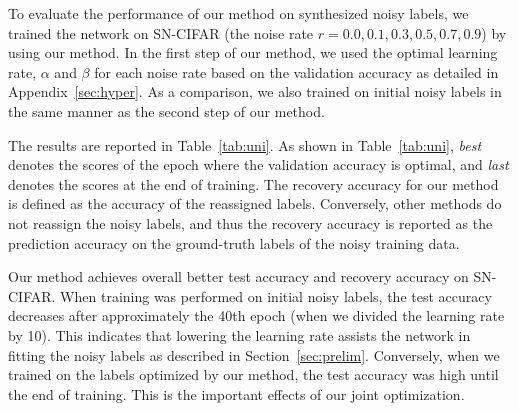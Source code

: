 \documentclass[10pt,twocolumn,letterpaper]{article}
\newcommand{\Tref}[1]{Table~\ref{#1}}
\newcommand{\Sref}[1]{Section~\ref{#1}}
\newcommand{\APref}[1]{Appendix~\ref{#1}}
\begin{document}
To evaluate the performance of our method on synthesized noisy labels, we trained the network on SN-CIFAR (the noise rate $r=0.0,0.1,0.3,0.5,0.7,0.9$) by using our method.
In the first step of our method, we used the optimal learning rate, $\alpha$ and $\beta$ for each noise rate based on the validation accuracy as detailed in \APref{sec:hyper}.
As a comparison, we also trained on initial noisy labels in the same manner as the second step of our method.

The results are reported in \Tref{tab:uni}. As shown in \Tref{tab:uni}, \textit{best} denotes the scores of the epoch where the validation accuracy is optimal, and \textit{last} denotes the scores at the end of training.
The recovery accuracy for our method is defined as the accuracy of the reassigned labels.
Conversely, other methods do not reassign the noisy labels, and thus the recovery accuracy is reported as the prediction accuracy on the ground-truth labels of the noisy training data.

Our method achieves overall better test accuracy and recovery accuracy on SN-CIFAR.
When training was performed on initial noisy labels, the test accuracy decreases after approximately the 40th epoch (when we divided the learning rate by 10). This indicates that lowering the learning rate assists the network in fitting the noisy labels as described in \Sref{sec:prelim}. Conversely, when we trained on the labels optimized by our method, the test accuracy was high until the end of training. This is the important effects of our joint optimization.
\end{document}
